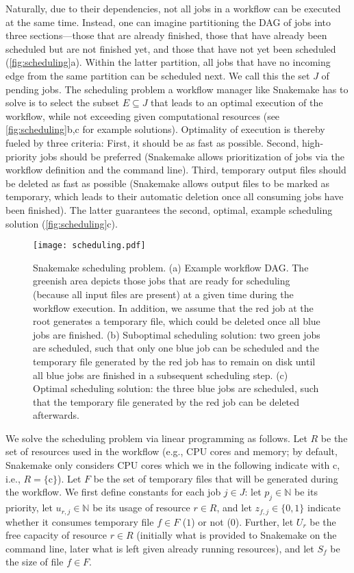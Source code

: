 \documentclass[parskip=half]{scrartcl}
\begin{document}
Naturally, due to their dependencies, not all jobs in a workflow can be executed at the same time.
Instead, one can imagine partitioning the DAG of jobs into three sections---those that are already finished, those that have already been scheduled but are not finished yet, and those that have not yet been scheduled (\autoref{fig:scheduling}a).
Within the latter partition, all jobs that have no incoming edge from the same partition can be scheduled next.
We call this the set $J$ of pending jobs.
The scheduling problem a workflow manager like Snakemake has to solve is to select the subset $E \subseteq J$ that leads to an optimal execution of the workflow, while not exceeding given computational resources (see \autoref{fig:scheduling}b,c for example solutions).
Optimality of execution is thereby fueled by three criteria:
First, it should be as fast as possible.
Second, high-priority jobs should be preferred (Snakemake allows prioritization of jobs via the workflow definition and the command line).
Third, temporary output files should be deleted as fast as possible (Snakemake allows output files to be marked as temporary, which leads to their automatic deletion once all consuming jobs have been finished).
The latter guarantees the second, optimal, example scheduling solution (\autoref{fig:scheduling}c).

\begin{figure}
	\centering
	\texttt{[image: scheduling.pdf]}
	\caption{Snakemake scheduling problem. (a) Example workflow DAG.
		The greenish area depicts those jobs that are ready for scheduling (because all input files are present) at a given time during the workflow execution.
		In addition, we assume that the red job at the root generates a temporary file, which could be deleted once all blue jobs are finished.
		(b) Suboptimal scheduling solution: two green jobs are scheduled, such that only one blue job can be scheduled and the temporary file generated by the red job has to remain on disk until all blue jobs are finished in a subsequent scheduling step. (c) Optimal scheduling solution: the three blue jobs are scheduled, such that the temporary file generated by the red job can be deleted afterwards.}\label{fig:scheduling}
\end{figure}

\newcommand{\N}{\mathbb{N}}
\newcommand{\cores}{\text{c}}

We solve the scheduling problem via linear programming as follows.
Let $R$ be the set of resources used in the workflow (e.g., CPU cores and memory; by default, Snakemake only considers CPU cores which we in the following indicate with $\cores$, i.e., $R = \{\cores\}$).
Let $F$ be the set of temporary files that will be generated during the workflow.
We first define constants for each job $j \in J$: let $p_j \in \N$ be its priority, let $u_{r,j} \in \N$ be its usage of resource $r \in R$, and let $z_{f,j} \in \{0,1\}$ indicate whether it consumes temporary file $f \in F$ ($1$) or not ($0$).
Further, let $U_r$ be the free capacity of resource $r \in R$ (initially what is provided to Snakemake on the command line, later what is left given already running resources), and let $S_f$ be the size of file $f \in F$.
\end{document}
